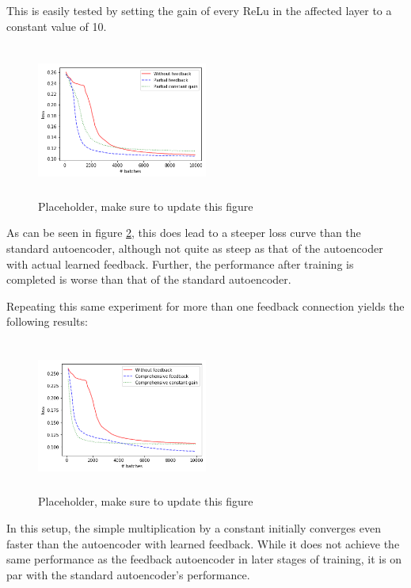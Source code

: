 \documentclass{article}
\begin{document}
  This is easily tested by setting the gain of every ReLu in the affected layer to a constant value of 10. 
  \begin{figure}[H]
      \centering
      \includegraphics[width=0.5\textwidth,height=5cm,keepaspectratio]{img/constgainpartial_loss.png}
      \caption{Placeholder, make sure to update this figure}
      \label{fig:contgainpartialloss}
  \end{figure}
  
  As can be seen in figure \ref{fig:contgainpartialloss}, this does lead to a steeper loss curve than the standard autoencoder, although not quite as steep as that of the autoencoder with actual learned feedback. Further, the performance after training is completed is worse than that of the standard autoencoder. 
  
  Repeating this same experiment for more than one feedback connection yields the following results: 
  
  \begin{figure}[H]
      \centering
      \includegraphics[width=0.5\textwidth,height=5cm,keepaspectratio]{img/constgainfull_loss.png}
      \caption{Placeholder, make sure to update this figure}
      \label{fig:contgainpartialloss}
  \end{figure}
  
  In this setup, the simple multiplication by a constant initially converges even faster than the autoencoder with learned feedback. While it does not achieve the same performance as the feedback autoencoder in later stages of training, it is on par with the standard autoencoder's performance. 
  
\end{document}
